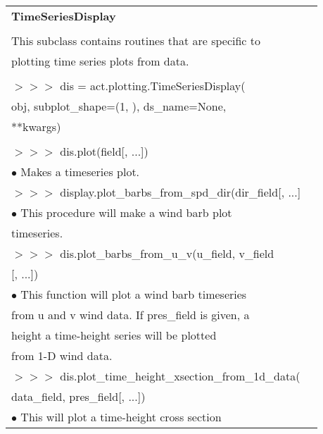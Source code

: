 \documentclass[potrait, z1paper, fontscale=0.33]{baposter} %
\begin{document}
\begin{poster}
{\begin{flushleft}
\begin{tabular}{@{}ll@{}}
\\
\multicolumn{2}{l}{\cellcolor[HTML]{DDFFFF}\bf TimeSeriesDisplay} \\
\\
This subclass contains routines that are specific to\\
plotting time series plots from data.\\
\\
$>$$>$$>$ dis = act.plotting.TimeSeriesDisplay(\\
\-\hspace{1.2cm} obj, subplot\_shape=(1, ), ds\_name=None,\\
\-\hspace{1.2cm} **kwargs)\\
\\
$>$$>$$>$ dis.plot(field[, ...])\\
\-\hspace{0.2cm} $\bullet$ Makes a timeseries plot.\\
$>$$>$$>$ display.plot\_barbs\_from\_spd\_dir(dir\_field[, ...]\\
\-\hspace{0.2cm} $\bullet$ This procedure will make a wind barb plot\\
\-\hspace{0.5cm} timeseries.\\
$>$$>$$>$ dis.plot\_barbs\_from\_u\_v(u\_field, v\_field\\
\-\hspace{1.2cm}  [, ...])\\
\-\hspace{0.2cm} $\bullet$ This function will plot a wind barb timeseries\\
\-\hspace{0.5cm} from u and v wind data. If pres\_field is given, a\\
\-\hspace{0.5cm} height a time-height series will be plotted\\
\-\hspace{0.5cm} from 1-D wind data.\\
$>$$>$$>$ dis.plot\_time\_height\_xsection\_from\_1d\_data(\\
\-\hspace{1.2cm} data\_field, pres\_field[, ...])\\
\-\hspace{0.2cm} $\bullet$ This will plot a time-height cross section\\

\end{tabular}
\end{flushleft}}
\end{poster}
\end{document}
